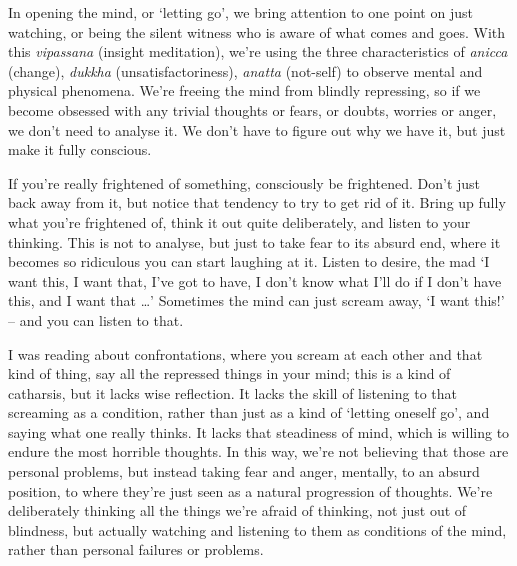 
In opening the mind, or `letting go', we bring attention to one point on just watching, or being the silent witness who is aware of what comes and goes. With this \textit{vipassana} (insight meditation), we're using the three characteristics of \textit{anicca} (change), \textit{dukkha} (unsatisfactoriness), \textit{anatta} (not-self) to observe mental and physical phenomena. We're freeing the mind from blindly repressing, so if we become obsessed with any trivial thoughts or fears, or doubts, worries or anger, we don't need to analyse it. We don't have to figure out why we have it, but just make it fully conscious.

If you're really frightened of something, consciously be frightened. Don't just back away from it, but notice that tendency to try to get rid of it. Bring up fully what you're frightened of, think it out quite deliberately, and listen to your thinking. This is not to analyse, but just to take fear to its absurd end, where it becomes so ridiculous you can start laughing at it. Listen to desire, the mad `I want this, I want that, I've got to have, I don't know what I'll do if I don't have this, and I want that \ldots{}' Sometimes the mind can just scream away, `I want this!' -- and you can listen to that.

I was reading about confrontations, where you scream at each other and that kind of thing, say all the repressed things in your mind; this is a kind of catharsis, but it lacks wise reflection. It lacks the skill of listening to that screaming as a condition, rather than just as a kind of `letting oneself go', and saying what one really thinks. It lacks that steadiness of mind, which is willing to endure the most horrible thoughts. In this way, we're not believing that those are personal problems, but instead taking fear and anger, mentally, to an absurd position, to where they're just seen as a natural progression of thoughts. We're deliberately thinking all the things we're afraid of thinking, not just out of blindness, but actually watching and listening to them as conditions of the mind, rather than personal failures or problems.

